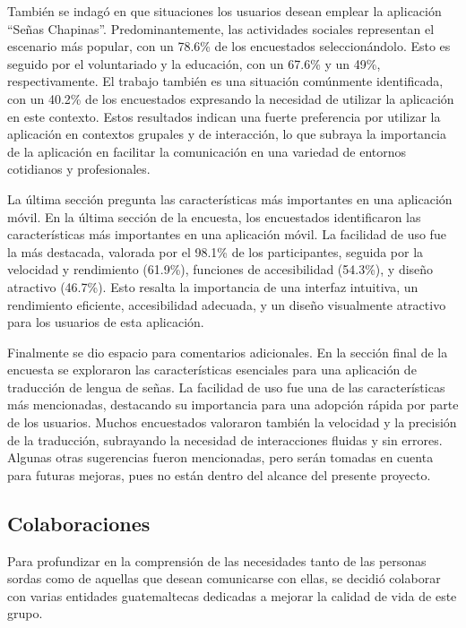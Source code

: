 También se indagó en que situaciones los usuarios desean emplear la aplicación ``Señas Chapinas''. Predominantemente, las actividades sociales representan el escenario más popular, con un 78.6\% de los encuestados seleccionándolo. Esto es seguido por el voluntariado y la educación, con un 67.6\% y un 49\%, respectivamente. El trabajo también es una situación comúnmente identificada, con un 40.2\% de los encuestados expresando la necesidad de utilizar la aplicación en este contexto. Estos resultados indican una fuerte preferencia por utilizar la aplicación en contextos grupales y de interacción, lo que subraya la importancia de la aplicación en facilitar la comunicación en una variedad de entornos cotidianos y profesionales.

La última sección pregunta las características más importantes en una aplicación móvil. En la última sección de la encuesta, los encuestados identificaron las características más importantes en una aplicación móvil. La facilidad de uso fue la más destacada, valorada por el 98.1\% de los participantes, seguida por la velocidad y rendimiento (61.9\%), funciones de accesibilidad (54.3\%), y diseño atractivo (46.7\%). Esto resalta la importancia de una interfaz intuitiva, un rendimiento eficiente, accesibilidad adecuada, y un diseño visualmente atractivo para los usuarios de esta aplicación. 

Finalmente se dio espacio para comentarios adicionales. En la sección final de la encuesta se exploraron las características esenciales para una aplicación de traducción de lengua de señas. La facilidad de uso fue una de las características más mencionadas, destacando su importancia para una adopción rápida por parte de los usuarios. Muchos encuestados valoraron también la velocidad y la precisión de la traducción, subrayando la necesidad de interacciones fluidas y sin errores. Algunas otras sugerencias fueron mencionadas, pero serán tomadas en cuenta para futuras mejoras, pues no están dentro del alcance del presente proyecto. 


\subsection{Colaboraciones}

Para profundizar en la comprensión de las necesidades tanto de las personas sordas como de aquellas que desean comunicarse con ellas, se decidió colaborar con varias entidades guatemaltecas dedicadas a mejorar la calidad de vida de este grupo.

